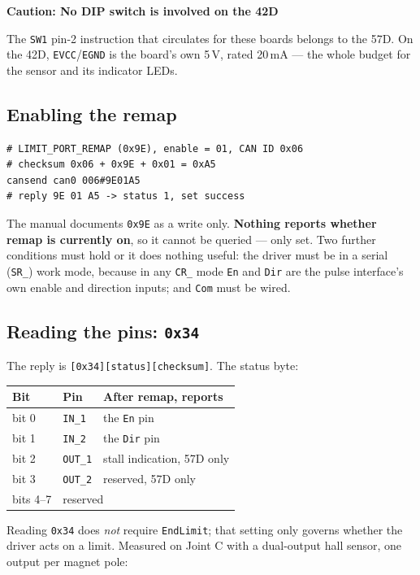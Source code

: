 \documentclass[11pt,letterpaper]{article}
\newenvironment{caution}[1]{%
    \par\addvspace{8pt}%
    \noindent{\color{cautionred}\rule{\linewidth}{0.8pt}}\par\vspace{2pt}
    \noindent\textbf{\color{cautionred}Caution: #1}\par\vspace{2pt}
}{%
    \par\vspace{2pt}\noindent{\color{cautionred}\rule{\linewidth}{0.4pt}}%
    \par\addvspace{8pt}%
}
\begin{document}
\begin{caution}{No DIP switch is involved on the 42D}
The \texttt{SW1} pin-2 instruction that circulates for these boards belongs to the
57D. On the 42D, \texttt{EVCC}/\texttt{EGND} is the board's own 5\,V, rated 20\,mA
--- the whole budget for the sensor and its indicator LEDs.
\end{caution}

\subsection{Enabling the remap}
\begin{lstlisting}
# LIMIT_PORT_REMAP (0x9E), enable = 01, CAN ID 0x06
# checksum 0x06 + 0x9E + 0x01 = 0xA5
cansend can0 006#9E01A5
# reply 9E 01 A5 -> status 1, set success
\end{lstlisting}

The manual documents \texttt{0x9E} as a write only. \textbf{Nothing reports whether
remap is currently on}, so it cannot be queried --- only set. Two further conditions
must hold or it does nothing useful: the driver must be in a serial
(\texttt{SR\_}) work mode, because in any \texttt{CR\_} mode \texttt{En} and
\texttt{Dir} are the pulse interface's own enable and direction inputs; and
\texttt{Com} must be wired.

\subsection{Reading the pins: \texttt{0x34}}
The reply is \texttt{[0x34][status][checksum]}. The status byte:

\begin{center}
\begin{tabular}{lll}
\toprule
\textbf{Bit} & \textbf{Pin} & \textbf{After remap, reports} \\ \midrule
bit 0 & \texttt{IN\_1} & the \texttt{En} pin \\
bit 1 & \texttt{IN\_2} & the \texttt{Dir} pin \\
bit 2 & \texttt{OUT\_1} & stall indication, 57D only \\
bit 3 & \texttt{OUT\_2} & reserved, 57D only \\
bits 4--7 & \multicolumn{2}{l}{reserved} \\
\bottomrule
\end{tabular}
\end{center}

Reading \texttt{0x34} does \emph{not} require \texttt{EndLimit}; that setting only
governs whether the driver acts on a limit. Measured on Joint C with a dual-output
hall sensor, one output per magnet pole:
\end{document}
